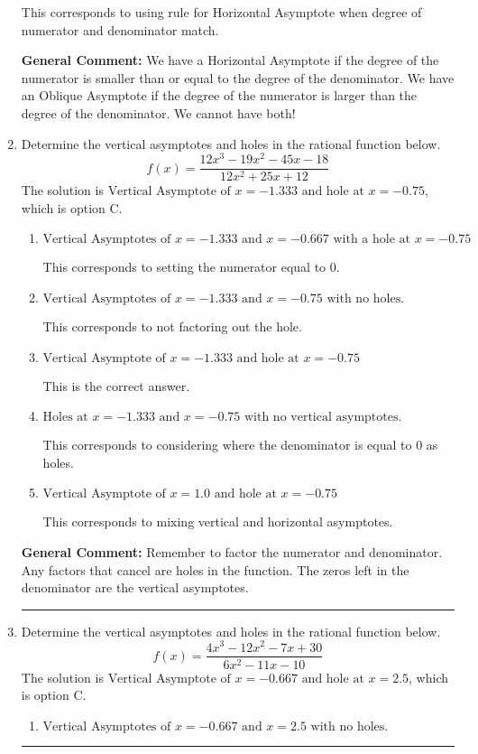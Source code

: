 \documentclass{extbook}[14pt]
\newcommand{\litem}[1]{\item #1

\rule{\textwidth}{0.4pt}}
\begin{document}
\begin{enumerate}
{\begin{enumerate}[label=\Alph*.]
This corresponds to using rule for Horizontal Asymptote when degree of numerator and denominator match.
\end{enumerate}

\textbf{General Comment:} We have a Horizontal Asymptote if the degree of the numerator is smaller than or equal to the degree of the denominator. We have an Oblique Asymptote if the degree of the numerator is larger than the degree of the denominator. We cannot have both!
}
\litem{
Determine the vertical asymptotes and holes in the rational function below.
\[ f(x) = \frac{12x^{3} -19 x^{2} -45 x -18}{12x^{2} +25 x + 12} \]The solution is \( \text{Vertical Asymptote of } x = -1.333 \text{ and hole at } x = -0.75 \), which is option C.\begin{enumerate}[label=\Alph*.]
\item \( \text{Vertical Asymptotes of } x = -1.333 \text{ and } x = -0.667 \text{ with a hole at } x = -0.75 \)

This corresponds to setting the numerator equal to 0.
\item \( \text{Vertical Asymptotes of } x = -1.333 \text{ and } x = -0.75 \text{ with no holes.} \)

This corresponds to not factoring out the hole.
\item \( \text{Vertical Asymptote of } x = -1.333 \text{ and hole at } x = -0.75 \)

This is the correct answer.
\item \( \text{Holes at } x = -1.333 \text{ and } x = -0.75 \text{ with no vertical asymptotes.} \)

This corresponds to considering where the denominator is equal to 0 as holes.
\item \( \text{Vertical Asymptote of } x = 1.0 \text{ and hole at } x = -0.75 \)

This corresponds to mixing vertical and horizontal asymptotes.
\end{enumerate}

\textbf{General Comment:} Remember to factor the numerator and denominator. Any factors that cancel are holes in the function. The zeros left in the denominator are the vertical asymptotes.
}
\litem{
Determine the vertical asymptotes and holes in the rational function below.
\[ f(x) = \frac{4x^{3} -12 x^{2} -7 x + 30}{6x^{2} -11 x -10} \]The solution is \( \text{Vertical Asymptote of } x = -0.667 \text{ and hole at } x = 2.5 \), which is option C.\begin{enumerate}[label=\Alph*.]
\item \( \text{Vertical Asymptotes of } x = -0.667 \text{ and } x = 2.5 \text{ with no holes.} \)


\end{enumerate}}
\end{enumerate}
\end{document}
